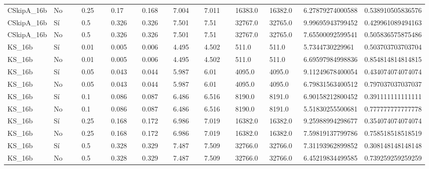 {{\begin{longtable}{M{0.09\linewidth}M{0.09\linewidth}M{0.09\linewidth}M{0.09\linewidth}M{0.09\linewidth}M{0.09\linewidth}M{0.09\linewidth}M{0.09\linewidth}M{0.09\linewidth}M{0.09\linewidth}M{0.09\linewidth}}
CSkipA\_16b & No & \num{0.25} & \num{0.17} & \num{0.168} & \num{7.004} & \num{7.011} & \num{16383.0} & \num{16382.0} & \num{6.27879274000588} & \num{0.538910505836576} \\
CSkipA\_16b & Sí & \num{0.5} & \num{0.326} & \num{0.326} & \num{7.501} & \num{7.51} & \num{32767.0} & \num{32765.0} & \num{9.99695943799452} & \num{0.429961089494163} \\
CSkipA\_16b & No & \num{0.5} & \num{0.326} & \num{0.326} & \num{7.501} & \num{7.51} & \num{32767.0} & \num{32765.0} & \num{7.65500092599541} & \num{0.505836575875486} \\
KS\_16b & Sí & \num{0.01} & \num{0.005} & \num{0.006} & \num{4.495} & \num{4.502} & \num{511.0} & \num{511.0} & \num{5.7344730229961} & \num{0.503703703703704} \\
KS\_16b & No & \num{0.01} & \num{0.005} & \num{0.006} & \num{4.495} & \num{4.502} & \num{511.0} & \num{511.0} & \num{6.69597984998836} & \num{0.854814814814815} \\
KS\_16b & Sí & \num{0.05} & \num{0.043} & \num{0.044} & \num{5.987} & \num{6.01} & \num{4095.0} & \num{4095.0} & \num{9.11249678400054} & \num{0.434074074074074} \\
KS\_16b & No & \num{0.05} & \num{0.043} & \num{0.044} & \num{5.987} & \num{6.01} & \num{4095.0} & \num{4095.0} & \num{6.79831563400512} & \num{0.797037037037037} \\
KS\_16b & Sí & \num{0.1} & \num{0.086} & \num{0.087} & \num{6.486} & \num{6.516} & \num{8190.0} & \num{8191.0} & \num{6.90158212800452} & \num{0.391111111111111} \\
KS\_16b & No & \num{0.1} & \num{0.086} & \num{0.087} & \num{6.486} & \num{6.516} & \num{8190.0} & \num{8191.0} & \num{5.51830255500681} & \num{0.777777777777778} \\
KS\_16b & Sí & \num{0.25} & \num{0.168} & \num{0.172} & \num{6.986} & \num{7.019} & \num{16382.0} & \num{16382.0} & \num{9.25988994298677} & \num{0.354074074074074} \\
KS\_16b & No & \num{0.25} & \num{0.168} & \num{0.172} & \num{6.986} & \num{7.019} & \num{16382.0} & \num{16382.0} & \num{7.59819137799786} & \num{0.758518518518519} \\
KS\_16b & Sí & \num{0.5} & \num{0.328} & \num{0.329} & \num{7.487} & \num{7.509} & \num{32766.0} & \num{32766.0} & \num{7.31193962899852} & \num{0.308148148148148} \\
KS\_16b & No & \num{0.5} & \num{0.328} & \num{0.329} & \num{7.487} & \num{7.509} & \num{32766.0} & \num{32766.0} & \num{6.45219834499585} & \num{0.739259259259259} \\

\end{longtable}}}

